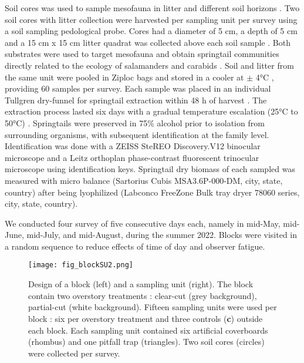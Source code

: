 Soil cores was used to sample mesofauna in litter and different soil horizons \citep{chauvatChangesSoilFaunal2011a,farskaManagementIntensityAffects2014,pongeVerticalDistributionCollembola2000,salamonEffectsPlantDiversity2004,wuCompositionSpatiotemporalVariation2014}. 
Two soil cores with litter collection were harvested per sampling unit per survey using a soil sampling pedological probe. 
Cores had a diameter of 5 cm, a depth of 5 cm and a 15 cm x 15 cm litter quadrat was collected above each soil sample \citep{raymond-leonardSpringtailCommunityStructure2018a,rousseauForestFloorMesofauna2018}.
Both substrates were used to target mesofauna and obtain springtail communities directly related to the ecology of salamanders and carabids \citep{chauvatChangesSoilFaunal2011a,edwardsAssessmentPopulationsSoilinhabiting1991,raymond-leonardSpringtailCommunityStructure2018a,rousseauForestFloorMesofauna2018}.
Soil and litter from the same unit were pooled in Ziploc\up{\texttrademark{}} bags and stored in a cooler at $\pm$ 4°C \citep{chauvatChangesSoilFaunal2011a,rousseauForestFloorMesofauna2018}, providing 60 samples per survey.
Each sample was placed in an individual Tullgren dry-funnel for springtail extraction within 48 h of harvest \citep{rousseauForestFloorMesofauna2018,rusekBiodiversityCollembolaTheir1998,wuCompositionSpatiotemporalVariation2014}. 
The extraction process lasted six days with a gradual temperature escalation (25°C to 50°C) \citep{raymond-leonardSpringtailCommunityStructure2018a}.
Springtails were preserved in 75\% alcohol \citep{wuCompositionSpatiotemporalVariation2014} prior to isolation from surrounding organisms, with subsequent identification at the family level.
Identification was done with a ZEISS SteREO Discovery.V12 binocular microscope and a Leitz orthoplan phase-contrast fluorescent trinocular microscope using \cite{bellingerChecklistCollembolaWorld1996} identification keys.
Springtail dry biomass of each sampled was measured with micro balance (Sartorius Cubis\up{\texttrademark{}} MSA3.6P-000-DM, city, state, country) after being lyophilized (Labconco FreeZone Bulk tray dryer 78060 series, city, state, country).

We conducted four survey of five consecutive days each, namely in mid-May, mid-June, mid-July, and mid-August, during the summer 2022.
Blocks were visited in a random sequence to reduce effects of time of day and observer fatigue.

\pagebreak

\begin{figure}[ht]
	\centering
	\texttt{[image: fig\_blockSU2.png]}
	\caption[Design of one block and one sampling unit with three sampling methods.]{
  Design of a block (left) and a sampling unit (right). 
  The block contain two overstory treatments : clear-cut (grey background), partial-cut (white background). 
  Fifteen sampling units were used per block : six per overstory treatment and three controls (\textbf{c}) outside each block.
  Each sampling unit contained six artificial coverboards (rhombus) and one pitfall trap (triangles). Two soil cores (circles) were collected per survey.
  }
	\label{fig:blockSU}
	\end{figure}  

